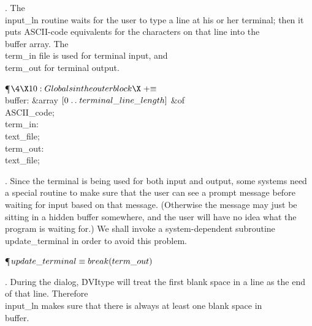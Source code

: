 . The \\{input\_ln} routine waits for the user to type a line at his or her
terminal; then it puts ASCII-code equivalents for the characters on that line
into the \\{buffer} array. The \\{term\_in} file is used for terminal input,
and \\{term\_out} for terminal output.

\Y\P$\4\X10:Globals in the outer block\X\mathrel{+}\S$\6
\4\\{buffer}: \&{array} $[0\to\\{terminal\_line\_length}]$ \1\&{of}\5
\\{ASCII\_code};\2\6
\4\\{term\_in}: \\{text\_file};%
\6
\4\\{term\_out}: \\{text\_file};\par
\fi

. Since the terminal is being used for both input and output, some systems
need a special routine to make sure that the user can see a prompt message
before waiting for input based on that message. (Otherwise the message
may just be sitting in a hidden buffer somewhere, and the user will have
no idea what the program is waiting for.) We shall invoke a system-dependent
subroutine \\{update\_terminal} in order to avoid this problem.

\Y\P\D {}$\\{update\_terminal}\S\\{break}(\\{term\_out})$\par
\fi

. During the dialog, \.{DVItype} will treat the first blank space in a
line as the end of that line. Therefore \\{input\_ln} makes sure that there
is always at least one blank space in \\{buffer}.

